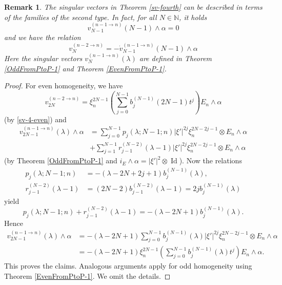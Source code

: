 \documentclass[a4paper,12pt,reqno]{amsart}
\newtheorem{bem}[theorem]{Remark}
\numberwithin{theorem}{subsection}
\numberwithin{equation}{section}
\begin{document}
\begin{bem}\label{sv4-der} The singular vectors in Theorem \ref{sv-fourth} can be described in
terms of the families of the second type. In fact, for all $N \in {\mathbb{N}}$, it holds
\begin{equation}\label{sv-van-4}
   v_{N-1}^{(n-1 \to n)}(N\!-\!1) \wedge \alpha = 0
\end{equation}
and we have the relation
\begin{equation}
   v_N^{(n-2 \to n)} = -\dot{v}_{N-1}^{(n-1 \to n)}(N\!-\!1) \wedge \alpha
\end{equation}
Here the singular vectors $v_N^{(n-1 \to n)}(\lambda)$ are defined in Theorem
\ref{OddFromPtoP-1} and Theorem \ref{EvenFromPtoP-1}.
\end{bem}

\begin{proof} For even homogeneity, we have
$$
   v^{(n-2\to n)}_{2N} = \xi_n^{2N-1} \left( \sum_{j=0}^{N-1} b_j^{(N-1)}(2N\!-\!1) t^j \right)
   E_n \wedge \alpha
$$
(by \eqref{sv-4-even}) and
\begin{align*}
   v_{2N-1}^{(n-1 \to n)}(\lambda) \wedge \alpha & = \sum_{j=0}^{N-1} p_j(\lambda;N\!-\!1;n)
   |\xi'|^{2j} \xi_n^{2N-2j-1} \otimes E_n \wedge \alpha \\
   & + \sum_{j=1}^{N-1} r_{j-1}^{(N-2)}(\lambda\!-\!1) |\xi'|^{2j} \xi_n^{2N-2j-1} \otimes
   E_n \wedge \alpha
\end{align*}
(by Theorem \ref{OddFromPtoP-1} and $i_E \wedge \alpha = |\xi'|^2 \otimes
{\operatorname{Id}}$). Now the relations
\begin{align*}
   p_j(\lambda;N\!-\!1;n) & = -(\lambda\!-\!2N\!+\!2j\!+\!1) b_j^{(N-1)}(\lambda), \\
   r_{j-1}^{(N-2)}(\lambda\!-\!1) & = (2N\!-\!2) b_{j-1}^{(N-2)}(\lambda\!-\!1) = 2j b_j^{(N-1)}(\lambda)
\end{align*}
yield
$$
   p_j(\lambda;N\!-\!1;n) +  r_{j-1}^{(N-2)}(\lambda\!-\!1) = -(\lambda\!-\!2N\!+\!1) b_j^{(N-1)}(\lambda).
$$
Hence
\begin{align*}
   v_{2N-1}^{(n-1 \to n)}(\lambda) \wedge \alpha & = -(\lambda\!-\!2N\!+\!1) \sum_{j=0}^{N-1} b_j^{(N-1)}(\lambda)
   |\xi'|^{2j} \xi_n^{2N-2j-1} \otimes E_n \wedge \alpha \\
   & = -(\lambda\!-\!2N\!+\!1) \xi_n^{2N-1} \left( \sum_{j=0}^{N-1} b_j^{(N-1)}(\lambda) t^j \right) E_n \wedge \alpha.
\end{align*}
This proves the claims. Analogous arguments apply for odd homogeneity using
Theorem \ref{EvenFromPtoP-1}. We omit the details.   
\end{proof}
\end{document}
